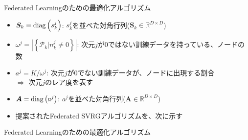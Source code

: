 \documentclass[dvipdfmx,notheorems,t]{beamer}
\begin{document}
\begin{frame}{Federated Learningのための最適化アルゴリズム}
\begin{itemize}
\begin{itemize}
		\item $\bm{S}_k = \operatorname{diag} \left( s_k^j \right)$: $s_k^j$を並べた対角行列($\bm{S}_k \in \mathbb{R}^{D \times D}$)
		\item $\omega^j = \left| \left\{ \mathcal{P}_k | n_k^j \neq 0 \right\} \right|$: 次元$j$が$0$ではない訓練データを持っている、ノードの数
		\newline
		
		\item $a^j = K / \omega^j$: 次元$j$が$0$でない訓練データが、ノードに出現する割合 \\
		$\Rightarrow$ 次元$j$のレア度を表す
		\item $\bm{A} = \operatorname{diag} \left( a^j \right)$: $a^j$を並べた対角行列($\bm{A} \in \mathbb{R}^{D \times D}$)
		\newline
		
		\item 提案されたFederated SVRGアルゴリズムを、次に示す
	\end{itemize}
\end{itemize}

\end{frame}

\begin{frame}{Federated Learningのための最適化アルゴリズム}

\begin{algorithm}[H]
	\DontPrintSemicolon
	\caption{Federated SVRG (FSVRG) ~\cite{1610.02527}}
	\label{alg:federated-svrg}
	\begin{algorithmic}[1]
				\ENDFOR
			\ENDFOR
		\ENDFOR
	\end{algorithmic}
\end{algorithm}

\end{frame}
\end{document}
